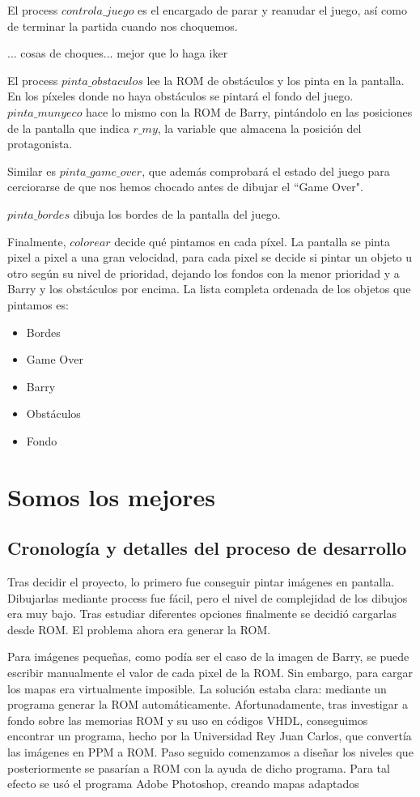 \documentclass[11pt, a4paper, spanish, openright, twoside]{book}
\begin{document}
El process $controla\_juego$ es el encargado de parar y reanudar el juego, así como de terminar la partida cuando nos choquemos.

... cosas de choques... mejor que lo haga iker

El process $pinta\_obstaculos$ lee la ROM de obstáculos y los pinta en la pantalla. En los píxeles donde no haya obstáculos se pintará el fondo del juego. $pinta\_munyeco$ hace lo mismo con la ROM de Barry, pintándolo en las posiciones de la pantalla que indica $r\_my$, la variable que almacena la posición del protagonista.

Similar es $pinta\_game\_over$, que además comprobará el estado del juego para cerciorarse de que nos hemos chocado antes de dibujar el ``Game Over".

$pinta\_bordes$ dibuja los bordes de la pantalla del juego.

Finalmente, $colorear$ decide qué pintamos en cada píxel. La pantalla se pinta pixel a pixel a una gran velocidad, para cada pixel se decide si pintar un objeto u otro según su nivel de prioridad, dejando los fondos con la menor prioridad y a Barry y los obstáculos por encima. La lista completa ordenada de los objetos que pintamos es:
\begin{itemize}
	\item Bordes
	\item Game Over
	\item Barry
	\item Obstáculos
	\item Fondo
\end{itemize}

\section{Somos los mejores }
\subsection{Cronología y detalles del proceso de desarrollo}
Tras decidir el proyecto, lo primero fue conseguir pintar imágenes en pantalla. Dibujarlas mediante process fue fácil, pero el nivel de complejidad de los dibujos era muy bajo. Tras estudiar diferentes opciones finalmente se decidió cargarlas desde ROM.
El problema ahora era generar la ROM.

Para imágenes pequeñas, como podía ser el caso de la imagen de Barry, se puede escribir manualmente el valor de cada pixel de la ROM. Sin embargo, para cargar los mapas era virtualmente imposible. La solución estaba clara: mediante un programa generar la ROM automáticamente. Afortunadamente, tras investigar a fondo sobre las memorias ROM y su uso en códigos VHDL, conseguimos encontrar un programa, hecho por la Universidad Rey Juan Carlos, que convertía las imágenes en PPM a ROM. Paso seguido comenzamos a diseñar los niveles que posteriormente se pasarían a ROM con la ayuda de dicho programa. Para tal efecto se usó el programa Adobe Photoshop, creando mapas adaptados 
\end{document}
